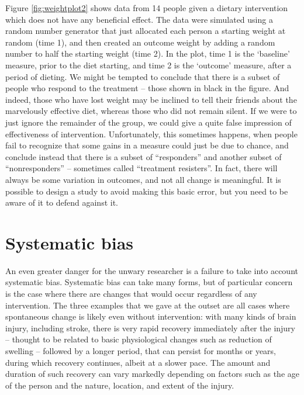 \documentclass{krantz}
\begin{document}
Figure \ref{fig:weightplot2} shows data from 14 people given a dietary intervention which does not have any beneficial effect. The data were simulated using a random number generator that just allocated each person a starting weight at random (time 1), and then created an outcome weight by adding a random number to half the starting weight (time 2). In the plot, time 1 is the `baseline' measure, prior to the diet starting, and time 2 is the `outcome' measure, after a period of dieting. We might be tempted to conclude that there is a subset of people who respond to the treatment -- those shown in black in the figure. And indeed, those who have lost weight may be inclined to tell their friends about the marvelously effective diet, whereas those who did not remain silent. If we were to just ignore the remainder of the group, we could give a quite false impression of effectiveness of intervention. Unfortunately, this sometimes happens, when people fail to recognize that some gains in a measure could just be due to chance, and conclude instead that there is a subset of ``responders'' and another subset of ``nonresponders'' -- sometimes called ``treatment resisters''. In fact, there will always be some variation in outcomes, and not all change is meaningful. It is possible to design a study to avoid making this basic error, but you need to be aware of it to defend against it.

\hypertarget{systematic-bias}{%
\section{Systematic bias}\label{systematic-bias}}

An even greater danger for the unwary researcher is a failure to take into account systematic bias. Systematic bias can take many forms, but of particular concern is the case where there are changes that would occur regardless of any intervention. The three examples that we gave at the outset are all cases where spontaneous change is likely even without intervention: with many kinds of brain injury, including stroke, there is very rapid recovery immediately after the injury -- thought to be related to basic physiological changes such as reduction of swelling -- followed by a longer period, that can persist for months or years, during which recovery continues, albeit at a slower pace. The amount and duration of such recovery can vary markedly depending on factors such as the age of the person and the nature, location, and extent of the injury.
\end{document}
